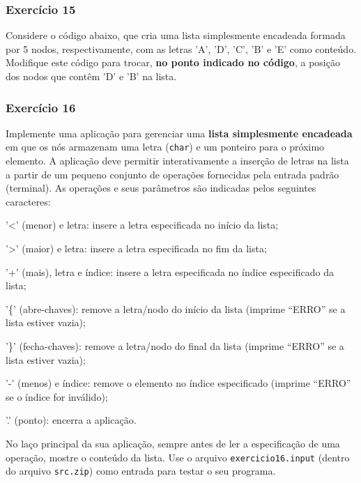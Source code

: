 \documentclass[aspectratio=169]{beamer}
\begin{document}
\begin{frame}[fragile]\frametitle{Exercício 15}
\begin{enumerate}
{\footnotesize
	\setcounter{enumi}{14}
	\item Considere o código abaixo, que cria uma lista simplesmente encadeada formada por 5 nodos, respectivamente, com as letras 'A', 'D', 'C', 'B' e 'E' como conteúdo. Modifique este código para trocar, \textbf{no ponto indicado no código}, a posição dos nodos que contêm 'D' e 'B' na lista.\\
\fontsize{6pt}{6pt}\selectfont{

}
}
\end{enumerate}
\end{frame}

\begin{frame}[fragile]\frametitle{Exercício 16}
\begin{enumerate}
{\small
	\setcounter{enumi}{15}
	\item Implemente uma aplicação para gerenciar uma \textbf{lista simplesmente encadeada} em que os nós armazenam uma letra (\texttt{char}) e um ponteiro para o próximo elemento. A aplicação deve permitir interativamente a inserção de letras na lista a partir de um pequeno conjunto de operações fornecidas pela entrada padrão (terminal). As operações e seus parâmetros são indicadas pelos seguintes caracteres:
	\begin{itemize}
	{\scriptsize
		\item '<' (menor) e letra: insere a letra especificada no início da lista;
		\item '>' (maior) e letra: insere a letra especificada no fim da lista;
		\item '+' (mais), letra e índice: insere a letra especificada no índice especificado da lista;
		\item '\{' (abre-chaves): remove a letra/nodo do início da lista (imprime ``ERRO'' se a lista estiver vazia);
		\item '\}' (fecha-chaves): remove a letra/nodo do final da lista (imprime ``ERRO'' se a lista estiver vazia);
		\item '-' (menos) e índice: remove o elemento no índice especificado (imprime ``ERRO'' se o índice for inválido);
		\item '.' (ponto): encerra a aplicação.
	}
	\end{itemize}
	No laço principal da sua aplicação, sempre antes de ler a especificação de uma operação, mostre o conteúdo da lista. Use o arquivo \texttt{exercicio16.input} (dentro do arquivo \texttt{src.zip}) como entrada para testar o seu programa.
}
\end{enumerate}
\end{frame}
\end{document}
